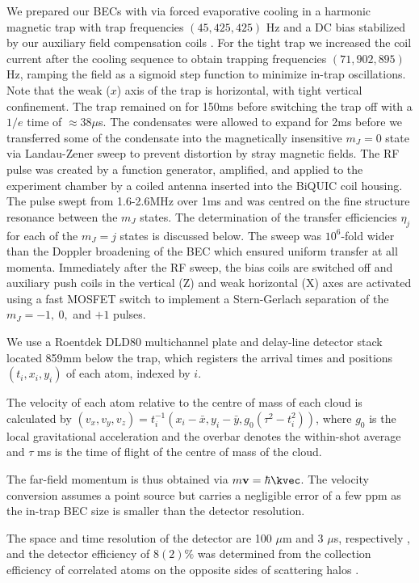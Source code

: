	We prepared our BECs with via forced evaporative cooling in a harmonic magnetic trap with trap frequencies $(45,425,425)$ Hz and a DC bias stabilized by our auxiliary field compensation coils \cite{Dall07,Dedman07}.
	For the tight trap we increased the coil current after the cooling sequence to obtain trapping frequencies $(71,902,895)$ Hz, ramping the field as a sigmoid step function to minimize in-trap oscillations.
	Note that the weak ($x$) axis of the trap is horizontal, with tight vertical confinement.
	The trap remained on for 150ms before switching the trap off with a $1/e$ time of $\approx38\mu$s.
	The condensates were allowed to expand for 2ms before we transferred some of the condensate into the magnetically insensitive $m_J=0$ state via Landau-Zener sweep to prevent distortion by stray magnetic fields.
	The RF pulse was created by a  function generator, amplified, and applied to the experiment chamber by a coiled antenna inserted into the BiQUIC coil housing.
	The pulse swept from 1.6-2.6MHz over 1ms and was centred on the fine structure resonance between the $m_J$ states.
	The determination of the transfer efficiencies $\eta_j$ for each of the $m_J = j$ states is discussed below.
	The sweep was $10^6$-fold wider than the Doppler broadening of the BEC which ensured uniform transfer at all momenta.
	Immediately after the RF sweep, the bias coils are switched off and auxiliary push coils in the vertical (Z) and weak horizontal (X) axes are activated using a fast MOSFET switch to implement a Stern-Gerlach separation of the $m_J = -1,~0,$ and $+1$ pulses.

	We use a Roentdek DLD80 multichannel plate and delay-line detector stack \cite{Manning10} located 859mm below the trap, which registers the arrival times and positions $(t_i,x_i,y_i)$ of each atom, indexed by $i$.
	
	The velocity of each atom relative to the centre of mass of each cloud is calculated by $(v_x,v_y,v_z) = t_{i}^{-1}(x_i-\bar{x},y_i-\bar{y},g_0(\tau^2-t_{i}^{2}))$, where $g_0$ is the local gravitational acceleration and the overbar denotes the within-shot average and $\tau$ ms is the time of flight of the centre of mass of the cloud.
	
	The far-field momentum is thus obtained via $m\textbf{v} = \hbar\kvec$.
	The velocity conversion assumes a point source but carries a negligible error of a few ppm as the in-trap BEC size is smaller than the detector resolution.
	
	The space and time resolution of the detector are 100 $\mu$m and 3 $\mu$s, respectively \cite{Henson18}, and the detector efficiency of $8(2)\%$ was determined from the collection efficiency of correlated atoms on the opposite sides of scattering halos \cite{Shin19,Shin20,Jaskula10}.
	

